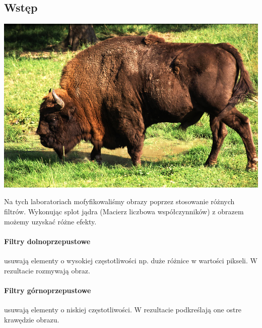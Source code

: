 \documentclass{article}
\begin{document}
	\subsection{Wstęp}
	\begin{center}
		\includegraphics[width=\linewidth]{../../pictures/zubr.jpg}
		\label{fig:bison}
	\end{center}
	Na tych laboratoriach mofyfikowaliśmy obrazy poprzez stosowanie różnych filtrów. Wykonując splot jądra (Macierz liczbowa współczynników) z obrazem możemy uzyskać różne efekty.
	
	\paragraph{Filtry dolnoprzepustowe} usuwają elementy o wysokiej częstotliwości np. duże różnice w wartości pikseli. W rezultacie rozmywają obraz.
	
	\paragraph{Filtry górnoprzepustowe} usuwają elementy o niskiej częstotliwości. W rezultacie podkreślają one ostre krawędzie obrazu.
	
\end{document}
